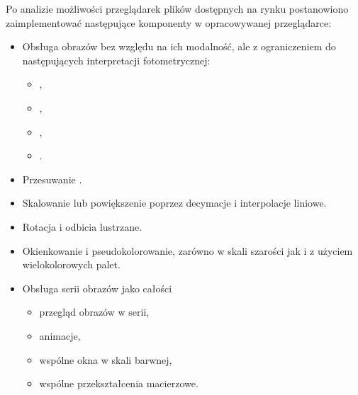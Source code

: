 
\par
Po analizie możliwości przeglądarek plików \DICOM dostępnych na rynku postanowiono zaimplementować następujące komponenty w opracowywanej przeglądarce:
\begin{itemize}
    \item Obsługa obrazów bez względu na ich modalność, ale z ograniczeniem do następujących interpretacji fotometrycznej:

          \begin{itemize}
              \item {},
              \item {},
              \item {},
              \item {}.
          \end{itemize}

    \item Przesuwanie .

    \item Skalowanie lub powiększenie poprzez decymacje i interpolacje liniowe.

    \item Rotacja i odbicia lustrzane.

    \item Okienkowanie i pseudokolorowanie, zarówno w skali szarości jak i z użyciem wielokolorowych palet.

    \item Obsługa serii obrazów jako całości
          \begin{itemize}
              \item przegląd obrazów w serii,
              \item animacje,
              \item wspólne okna w skali barwnej,
              \item wspólne przekształcenia macierzowe.
          \end{itemize}
\end{itemize}
